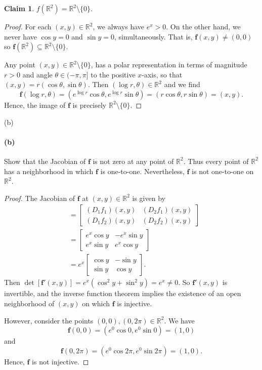 \documentclass[12pt]{article}
\newenvironment{fullbox}{\begin{lrbox}{\savefullbox}\begin{minipage}{\dimexpr\textwidth-2\fboxsep\relax}}{\end{minipage}\end{lrbox}\begin{center}\framebox[\textwidth]{\usebox{\savefullbox}}\end{center}}
\newenvironment{pbox}[1][]{\begin{fullbox}\ifx#1\empty\else\paragraph{#1}\fi}{\end{fullbox}}
\theoremstyle{definition}
\newtheorem*{claim*}{Claim}
\newcommand{\R}{\mathbb{R}}
\newcommand{\f}{\mathbf{f}}
\newcommand{\mat}[1]{\begin{bmatrix}#1\end{bmatrix}}
\begin{document}
\begin{claim*}
    $f(\R^2) = \R^2 \setminus \{0\}$.
\end{claim*}

\begin{proof}
    For each $(x, y) \in \R^2$, we always have $e^x > 0$. On the other hand, we never have $\cos y = 0$ and $\sin y = 0$, simultaneously. That is, $\f(x, y) \ne (0, 0)$ so $\f(\R^2) \subseteq \R^2 \setminus \{0\}$.

    Any point $(x, y) \in \R^2 \setminus \{0\}$, has a polar representation in terms of magnitude $r > 0$ and angle $\theta \in (-\pi, \pi]$ to the positive $x$-axis, so that $(x, y) = r(\cos\theta, \sin\theta)$. Then $(\log r, \theta) \in \R^2$ and we find
    \[
        \f(\log r, \theta) = (e^{\log r}\cos \theta, e^{\log r}\sin \theta) = (r\cos \theta, r\sin \theta) = (x, y).
    \]
    Hence, the image of $\f$ is precisely $\R^2 \setminus \{0\}$.

\end{proof}

\begin{pbox}[(b)]
    Show that the Jacobian of $\f$ is not zero at any point of $\R^2$. Thus every point of $\R^2$ has a neighborhood in which $\f$ is one-to-one. Nevertheless, $\f$ is not one-to-one on $\R^2$.
\end{pbox}

\begin{proof}
    The Jacobian of $\f$ at $(x, y) \in \R^2$ is given by
    \begin{align*}
        [\f'(x, y)]
            &= \mat{(D_1f_1)(x, y) & (D_2f_1)(x, y) \\ (D_1f_2)(x, y) & (D_2f_2)(x, y)} \\
            &= \mat{e^x\cos y & -e^x\sin y \\ e^x\sin y & e^x\cos y} \\
            &= e^x \mat{\cos y & -\sin y \\ \sin y & \cos y}.
    \end{align*}
    Then $\det [\f'(x, y)] = e^x(\cos^2 y + \sin^2 y) = e^x \ne 0$. So $\f'(x, y)$ is invertible, and the inverse function theorem implies the existence of an open neighborhood of $(x, y)$ on which $\f$ is injective. 

    However, consider the points $(0, 0), (0, 2\pi) \in \R^2$. We have
    \[
        \f(0, 0) = (e^0\cos0, e^0\sin0) = (1, 0)
    \]
    and
    \[
        \f(0, 2\pi) = (e^0\cos 2\pi, e^0\sin 2\pi) = (1, 0).
    \]
    Hence, $\f$ is not injective.

\end{proof}
\end{document}
